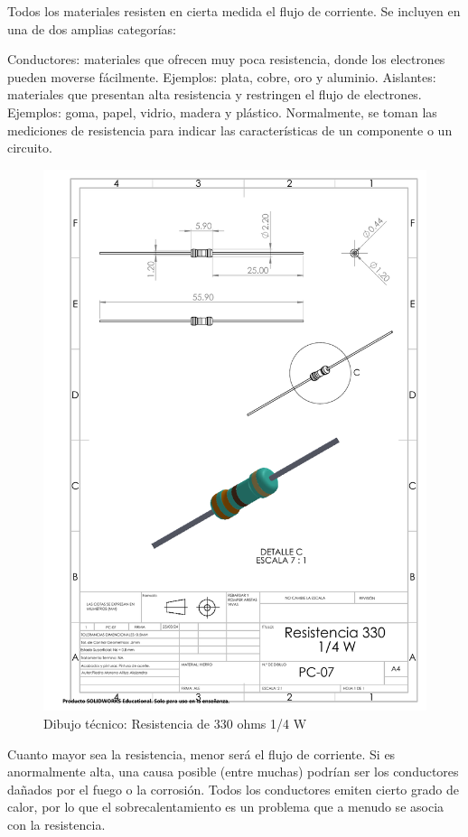    
    
    
    
    Todos los materiales resisten en cierta medida el flujo de corriente. Se incluyen en una de dos amplias categorías:
    
    Conductores: materiales que ofrecen muy poca resistencia, donde los electrones pueden moverse fácilmente. Ejemplos: plata, cobre, oro y aluminio.
    Aislantes: materiales que presentan alta resistencia y restringen el flujo de electrones. Ejemplos: goma, papel, vidrio, madera y plástico.
    Normalmente, se toman las mediciones de resistencia para indicar las características de un componente o un circuito.
    \begin{figure}[H]
        \centering
        \includegraphics[trim = {7mm 1mm 1mm 1mm},clip,scale=0.4]{22/Img/resistenciaDibujo.PDF}
        \caption{Dibujo técnico: Resistencia de 330 ohms 1/4 W}
        \label{fig:resistencia}
    \end{figure}
    Cuanto mayor sea la resistencia, menor será el flujo de corriente. Si es anormalmente alta, una causa posible (entre muchas) podrían ser los conductores dañados por el fuego o la corrosión. Todos los conductores emiten cierto grado de calor, por lo que el sobrecalentamiento es un problema que a menudo se asocia con la resistencia.
    
